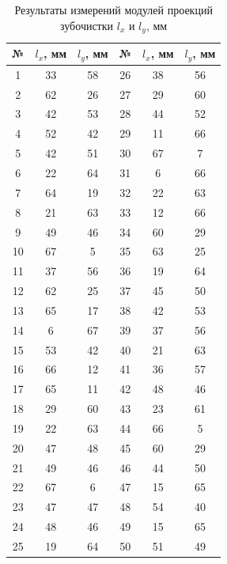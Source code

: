 \documentclass[a4paper, 14pt]{extarticle}
\begin{document}
\begin{table}[H]
  \centering
  \caption{Результаты измерений модулей проекций зубочистки $l_x$ и $l_y$, мм}
  \label{tab:raw_data}
  \begin{tabular}{|c|c|c|c|c|c|}
    \hline
    № & $l_x$, мм & $l_y$, мм & № & $l_x$, мм & $l_y$, мм \\
    \hline
    1 & 33 & 58 & 26 & 38 & 56 \\
    \hline
    2 & 62 & 26 & 27 & 29 & 60 \\
    \hline
    3 & 42 & 53 & 28 & 44 & 52 \\
    \hline
    4 & 52 & 42 & 29 & 11 & 66 \\
    \hline
    5 & 42 & 51 & 30 & 67 &  7 \\
    \hline
    6 & 22 & 64 & 31 &  6 & 66 \\
    \hline
    7 & 64 & 19 & 32 & 22 & 63 \\
    \hline
    8 & 21 & 63 & 33 & 12 & 66 \\
    \hline
    9 & 49 & 46 & 34 & 60 & 29 \\
    \hline
    10 & 67 &  5 & 35 & 63 & 25 \\
    \hline
    11 & 37 & 56 & 36 & 19 & 64 \\
    \hline
    12 & 62 & 25 & 37 & 45 & 50 \\
    \hline
    13 & 65 & 17 & 38 & 42 & 53 \\
    \hline
    14 &  6 & 67 & 39 & 37 & 56 \\
    \hline
    15 & 53 & 42 & 40 & 21 & 63 \\
    \hline
    16 & 66 & 12 & 41 & 36 & 57 \\
    \hline
    17 & 65 & 11 & 42 & 48 & 46 \\
    \hline
    18 & 29 & 60 & 43 & 23 & 61 \\
    \hline
    19 & 22 & 63 & 44 & 66 &  5 \\
    \hline
    20 & 47 & 48 & 45 & 60 & 29 \\
    \hline
    21 & 49 & 46 & 46 & 44 & 50 \\
    \hline
    22 & 67 &  6 & 47 & 15 & 65 \\
    \hline
    23 & 47 & 47 & 48 & 54 & 40 \\
    \hline
    24 & 48 & 46 & 49 & 15 & 65 \\
    \hline
    25 & 19 & 64 & 50 & 51 & 49 \\
    \hline
  \end{tabular}
\end{table}
\end{document}
